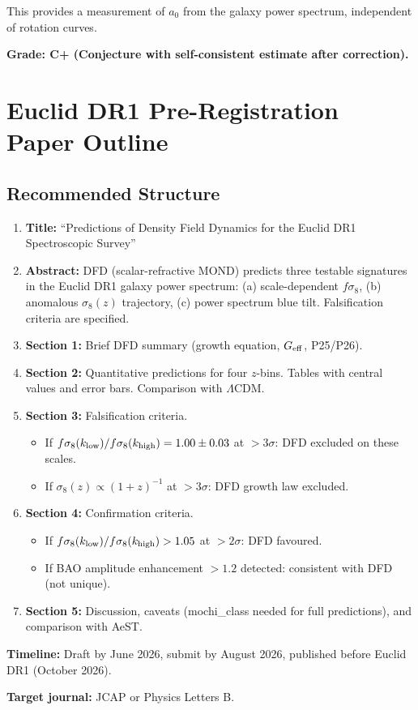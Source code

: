 \documentclass[11pt]{article}
\newcommand{\LCDM}{$\Lambda$CDM}
\newcommand{\Geff}{G_{\rm eff}}
\newcommand{\aM}{a_0}
\begin{document}
This provides a measurement of $\aM$ from the galaxy power spectrum,
independent of rotation curves.

\textbf{Grade: C+ (Conjecture with self-consistent estimate after
correction).}

\section{Euclid DR1 Pre-Registration Paper Outline}
\label{sec:paper}

\subsection{Recommended Structure}

\begin{enumerate}
\item \textbf{Title:}  ``Predictions of Density Field Dynamics for the
  Euclid DR1 Spectroscopic Survey''
\item \textbf{Abstract:}  DFD (scalar-refractive MOND) predicts
  three testable signatures in the Euclid DR1 galaxy power spectrum:
  (a) scale-dependent $f\sigma_8$, (b) anomalous $\sigma_8(z)$
  trajectory, (c) power spectrum blue tilt.  Falsification criteria
  are specified.
\item \textbf{Section 1:}  Brief DFD summary (growth equation, $\Geff$,
  P25/P26).
\item \textbf{Section 2:}  Quantitative predictions for four $z$-bins.
  Tables with central values and error bars.  Comparison with \LCDM.
\item \textbf{Section 3:}  Falsification criteria.
  \begin{itemize}
  \item If $f\sigma_8(k_{\rm low})/f\sigma_8(k_{\rm high}) = 1.00
    \pm 0.03$ at $> 3\sigma$: DFD excluded on these scales.
  \item If $\sigma_8(z) \propto (1+z)^{-1}$ at $> 3\sigma$: DFD
    growth law excluded.
  \end{itemize}
\item \textbf{Section 4:}  Confirmation criteria.
  \begin{itemize}
  \item If $f\sigma_8(k_{\rm low})/f\sigma_8(k_{\rm high}) > 1.05$
    at $> 2\sigma$: DFD favoured.
  \item If BAO amplitude enhancement $> 1.2$ detected: consistent
    with DFD (not unique).
  \end{itemize}
\item \textbf{Section 5:}  Discussion, caveats (mochi\_class needed
  for full predictions), and comparison with AeST.
\end{enumerate}

\textbf{Timeline:}  Draft by June 2026, submit by August 2026,
published before Euclid DR1 (October 2026).

\textbf{Target journal:}  JCAP or Physics Letters B.
\end{document}
